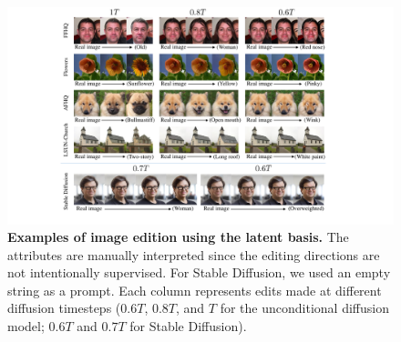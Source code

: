 

\begin{figure}[!t]
    \centering
    \includegraphics[width=1.0\linewidth]{figure/local_main.pdf}
    \vspace{-1em}
    \caption{\textbf{{Examples of image edition using the latent basis}.} 
    The attributes are manually interpreted {since the editing directions are not intentionally supervised.}
    For Stable Diffusion, we {used} an empty string as a prompt.
    {Each column represents edits made} at different diffusion timesteps ($0.6T$, $0.8T$, and $T$ for the unconditional diffusion model; $0.6T$ and $0.7T$ for Stable Diffusion).
    }
    \vspace{-1em}
    \label{fig:local_basis}
\end{figure}


